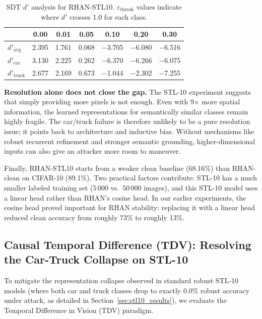\documentclass[12pt,a4paper]{article}
\begin{document}
\begin{table}[H]
\centering
\caption{SDT $d'$ analysis for RHAN-STL10. $\varepsilon_{\text{thresh}}$
values indicate where $d'$ crosses 1.0 for each class.}
\label{tab:stl10_sdt}
\renewcommand{\arraystretch}{1.25}
\begin{tabularx}{\textwidth}{lCCCCCC}
\toprule
& \textbf{0.00} & \textbf{0.01} & \textbf{0.05} &
\textbf{0.10} & \textbf{0.20} & \textbf{0.30} \\
\midrule
$d'_{\text{avg}}$   & 2.395 & 1.761 & 0.068 & $-$3.705 & $-$6.080 & $-$6.516 \\
$d'_{\text{car}}$   & 3.130 & 2.225 & 0.262 & $-$6.370 & $-$6.266 & $-$6.075 \\
$d'_{\text{truck}}$ & 2.677 & 2.169 & 0.673 & $-$1.044 & $-$2.302 & $-$7.255 \\
\bottomrule
\end{tabularx}
\end{table}

\textbf{Resolution alone does not close the gap.} The STL-10 experiment suggests
that simply providing more pixels is not enough. Even with 9$\times$ more spatial
information, the learned representations for semantically similar classes remain
highly fragile. The car/truck failure is therefore unlikely to be a pure
resolution issue; it points back to architecture and inductive bias. Without
mechanisms like robust recurrent refinement and stronger semantic grounding,
higher-dimensional inputs can also give an attacker more room to maneuver.

Finally, RHAN-STL10 starts from a weaker clean baseline (68.16\%) than
RHAN-clean on CIFAR-10 (89.1\%). Two practical factors contribute: STL-10 has a
much smaller labeled training set (5\,000 vs.\ 50\,000 images), and this STL-10
model uses a linear head rather than RHAN's cosine head. In our earlier
experiments, the cosine head proved important for RHAN stability: replacing it
with a linear head reduced clean accuracy from roughly 73\% to roughly 13\%.

\subsection{Causal Temporal Difference (TDV): Resolving the Car-Truck Collapse on STL-10}
\label{sec:tdv_results}

To mitigate the representation collapse observed in standard robust STL-10 models (where both car and truck classes drop to exactly 0.0\% robust accuracy under attack, as detailed in Section~\ref{sec:stl10_results}), we evaluate the Temporal Difference in Vision (TDV) paradigm. 
\end{document}
